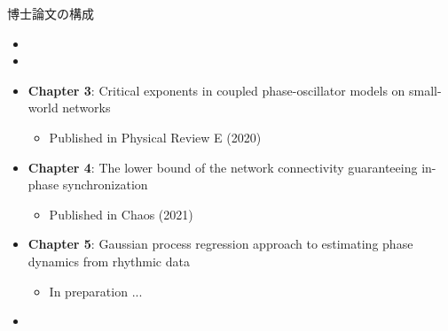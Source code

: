 \begin{frame}{博士論文の構成}
\begin{itemize}
  \item {}
  \item {}
  \item \textbf{Chapter 3}: Critical exponents in coupled phase-oscillator models on small-world networks
  \begin{itemize}
    \item Published in Physical Review E (2020)
  \end{itemize}
  \item \textbf{Chapter 4}: The lower bound of the network connectivity guaranteeing in-phase synchronization
  \begin{itemize}
    \item Published in Chaos (2021)
  \end{itemize}
  \item \textbf{Chapter 5}: Gaussian process regression approach to estimating phase dynamics from rhythmic data
  \begin{itemize}
    \item In preparation ...
  \end{itemize}
  \item {}
\end{itemize}
\end{frame}